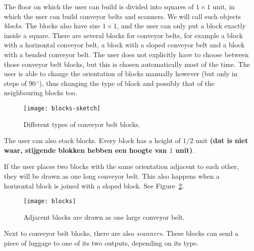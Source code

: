 The floor on which the user can build is divided into squares of $1 \times 1$ unit, in which the user can build conveyor belts and scanners. We will call such objects \textit{blocks}. The blocks also have size $1 \times 1$, and the user can only put a block exactly inside a square. There are several blocks for conveyor belts, for example a block with a horizontal conveyor belt, a block with a sloped conveyor belt and a block with a bended conveyor belt. The user does not explicitly have to choose between those conveyor belt blocks, but this is chosen automatically most of the time. The user is able to change the orientation of blocks manually however (but only in steps of $90\,^\circ$), thus changing the type of block and possibly that of the neighbouring blocks too.

\begin{figure}
  \begin{center}
    \texttt{[image: blocks-sketch]}
    \caption{Different types of conveyor belt blocks.}
    \label{fig:block-types}
  \end{center}
\end{figure}

The user can also stack blocks. Every block has a height of $1/2$ unit \textbf{(dat is niet waar, stijgende blokken hebben een hoogte van $1$ unit)}.

If the user places two blocks with the same orientation adjacent to each other, they will be drawn as one long conveyor belt. This also happens when a horizontal block is joined with a sloped block. See Figure~\ref{fig:blocks}.

\begin{figure}
  \begin{center}
    \texttt{[image: blocks]}
    \caption{Adjacent blocks are drawn as one large conveyor belt.}
    \label{fig:blocks}
  \end{center}
\end{figure}

Next to conveyor belt blocks, there are also \textit{scanners}. These blocks can send a piece of luggage to one of its two outputs, depending on its type.